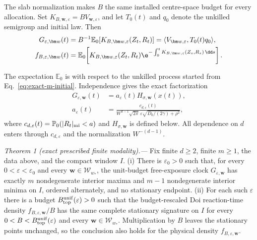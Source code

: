 The slab normalization makes $B$ the same installed centre-space budget for
every allocation.  Set $K_{B,\bm w,\varepsilon}=B V_{\bm w,\varepsilon}$,
and let $T_0(t)$ and $q_0$ denote the unkilled semigroup and initial law.  Then
\begin{equation}
 \begin{aligned}
 G_{\varepsilon,\bm w}(t)
 &=B^{-1}\mathbb E_0[K_{B,\bm w,\varepsilon}(Z_t,R_t)]
 =\langle V_{\bm w,\varepsilon},T_0(t)q_0\rangle,\\
 f_{B,\varepsilon,\bm w}(t)
 &=\mathbb E_0\!\left[K_{B,\bm w,\varepsilon}(Z_t,R_t)
  \e^{-\int_0^tK_{B,\bm w,\varepsilon}(Z_s,R_s)\,\dd s}\right].
 \end{aligned}
 \label{eq:exact-m-observables}
\end{equation}

The expectation $\mathbb E_0$ is with respect to the unkilled process started
from Eq.~\eqref{eq:exact-m-initial}.  Independence gives the exact
factorization
\begin{align}
 G_{\varepsilon,\bm w}(t)
 &=a_\varepsilon(t)H_{\sigma,\bm w}(x(t)),\nonumber\\
 a_\varepsilon(t)
 &=\frac{c_{d,\varepsilon}(t)}
 {W^{d-1}\sqrt{2\pi}\,\varepsilon
  \sqrt{D_0/(2\gamma)+\rho^2}},
 \label{eq:exact-m-factorization}
\end{align}
where $c_{d,\varepsilon}(t)=
\mathbb P_0(|R_t|_{\rm mi}<a)$ and $H_{\sigma,\bm w}$ is defined below.
All dependence on $d$ enters through $c_{d,\varepsilon}$ and the
normalization $W^{-(d-1)}$.

\medskip
\noindent\textit{Theorem 1 (exact prescribed finite modality).---}
Fix finite $d\ge2$, finite $m\ge1$, the data above, and the compact window
$I$.
(i) There is $\varepsilon_0>0$ such that, for every
$0<\varepsilon<\varepsilon_0$ and every $\bm w\in\mathcal W_{w_*}$, the
unit-budget free-exposure clock $G_{\varepsilon,\bm w}$ has exactly $m$
nondegenerate interior maxima and $m-1$ nondegenerate interior minima on
$I$, ordered alternately, and no stationary endpoint.
(ii) For each such $\varepsilon$ there is a budget
$B_{\rm top}^{\rm unif}(\varepsilon)>0$ such that the budget-rescaled Doi
reaction-time density $f_{B,\varepsilon,\bm w}/B$ has the same complete
stationary signature on $I$ for every
$0<B<B_{\rm top}^{\rm unif}(\varepsilon)$ and every
$\bm w\in\mathcal W_{w_*}$.  Multiplication by $B$ leaves the stationary
points unchanged, so the conclusion also holds for the physical density
$f_{B,\varepsilon,\bm w}$.

